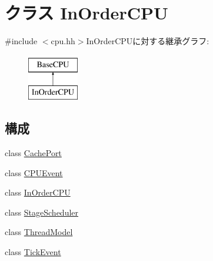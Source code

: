 \hypertarget{classInOrderCPU}{
\section{クラス InOrderCPU}
\label{classInOrderCPU}
}


{\ttfamily \#include $<$cpu.hh$>$}InOrderCPUに対する継承グラフ:\begin{figure}[H]
\begin{center}
\leavevmode
\includegraphics[height=2cm]{classInOrderCPU}
\end{center}
\end{figure}
\subsection*{構成}
\begin{DoxyCompactItemize}
\item 
class \hyperlink{classInOrderCPU_1_1CachePort}{CachePort}
\item 
class \hyperlink{classInOrderCPU_1_1CPUEvent}{CPUEvent}
\item 
class \hyperlink{classInOrderCPU_1_1InOrderCPU}{InOrderCPU}
\item 
class \hyperlink{classInOrderCPU_1_1StageScheduler}{StageScheduler}
\item 
class \hyperlink{classInOrderCPU_1_1ThreadModel}{ThreadModel}
\item 
class \hyperlink{classInOrderCPU_1_1TickEvent}{TickEvent}
\end{DoxyCompactItemize}
